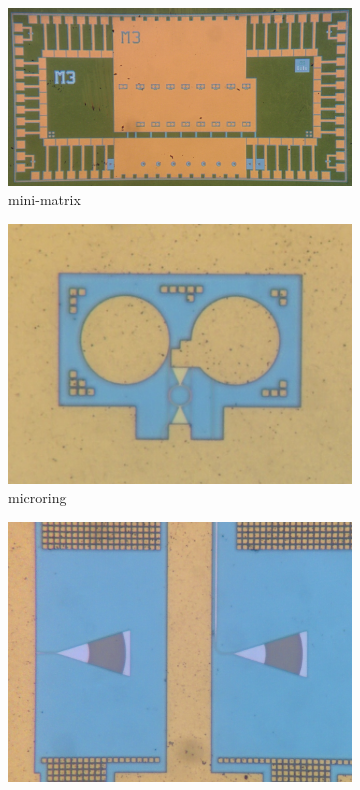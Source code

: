 \begin{figure}[htbp]
	\centering
	\begin{subfigure}[b]{0.7\textwidth}
		\centering
		\includegraphics[width=\textwidth]{photos/minimatrix.png}
		\caption{mini-matrix}
		\label{fig:photo_minimatrix}
	\end{subfigure}
	\begin{subfigure}[t]{0.345\textwidth}
		\centering
		\includegraphics[width=\textwidth]{photos/ring.png}
		\caption{microring}
		\label{fig:photo_ring}
	\end{subfigure}
	\begin{subfigure}[t]{0.345\textwidth}
		\centering
		\includegraphics[width=\textwidth]{photos/grating.png}

\end{subfigure}
\end{figure}
